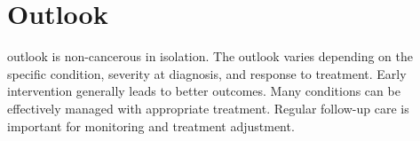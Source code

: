 \section{Outlook}
outlook is non-cancerous in isolation. The outlook varies depending on the specific condition, severity at diagnosis, and response to treatment. Early intervention generally leads to better outcomes. Many conditions can be effectively managed with appropriate treatment. Regular follow-up care is important for monitoring and treatment adjustment.
